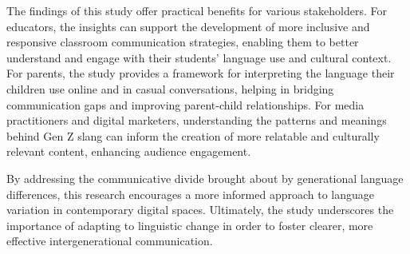 The findings of this study offer practical benefits for various stakeholders. For educators, the insights can support the development of more inclusive and responsive classroom communication strategies, enabling them to better understand and engage with their students' language use and cultural context. For parents, the study provides a framework for interpreting the language their children use online and in casual conversations, helping in bridging communication gaps and improving parent-child relationships. For media practitioners and digital marketers, understanding the patterns and meanings behind Gen Z slang can inform the creation of more relatable and culturally relevant content, enhancing audience engagement.

By addressing the communicative divide brought about by generational language differences, this research encourages a more informed approach to language variation in contemporary digital spaces. Ultimately, the study underscores the importance of adapting to linguistic change in order to foster clearer, more effective intergenerational communication.
